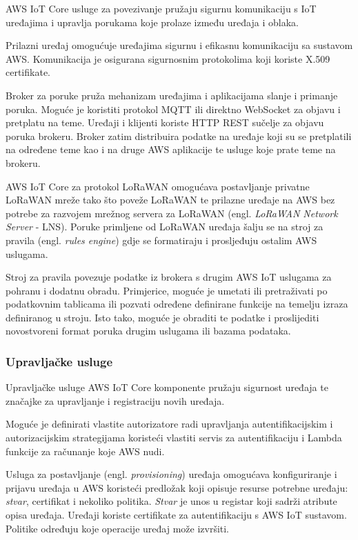 AWS IoT Core usluge za povezivanje pružaju sigurnu komunikaciju s IoT uređajima i upravlja porukama koje prolaze između uređaja i oblaka.

Prilazni uređaj omogućuje uređajima sigurnu i efikasnu komunikaciju sa sustavom AWS. Komunikacija je osigurana sigurnosnim protokolima koji koriste  X.509 certifikate. 

Broker za poruke pruža mehanizam uređajima i aplikacijama slanje i primanje poruka. Moguće je koristiti protokol MQTT ili direktno WebSocket za objavu i pretplatu na teme. Uređaji i klijenti koriste HTTP REST sučelje za objavu poruka brokeru. Broker zatim distribuira podatke na uređaje koji su se pretplatili na određene teme kao i na druge AWS aplikacije te usluge koje prate teme na brokeru.

AWS IoT Core za protokol LoRaWAN omogućava postavljanje privatne LoRaWAN mreže tako što poveže LoRaWAN te prilazne uređaje na AWS bez potrebe za razvojem mrežnog servera za LoRaWAN (engl. \textit{LoRaWAN Network Server} - LNS). Poruke primljene od LoRaWAN uređaja šalju se na stroj za pravila (engl. \textit{rules engine}) gdje se formatiraju i prosljeđuju ostalim AWS uslugama.

Stroj za pravila povezuje podatke iz brokera s drugim AWS IoT uslugama za pohranu i dodatnu obradu. Primjerice, moguće je umetati ili pretraživati po podatkovnim tablicama ili pozvati određene definirane funkcije na temelju izraza definiranog u stroju. Isto tako, moguće je obraditi te podatke i proslijediti novostvoreni format poruka drugim uslugama ili bazama podataka.

\subsubsection{Upravljačke usluge}

Upravljačke usluge AWS IoT Core komponente pružaju sigurnost uređaja te značajke za upravljanje i registraciju novih uređaja.

Moguće je definirati vlastite autorizatore radi upravljanja autentifikacijskim i autorizacijskim strategijama koristeći vlastiti servis za autentifikaciju i Lambda funkcije za računanje koje AWS nudi. 

Usluga za postavljanje (engl. \textit{provisioning}) uređaja omogućava konfiguriranje i prijavu uređaja u AWS koristeći predložak koji opisuje resurse potrebne uređaju: \textit{stvar}, certifikat i nekoliko politika. \textit{Stvar} je unos u registar koji sadrži atribute opisa uređaja. Uređaji koriste certifikate za autentifikaciju s AWS IoT sustavom. Politike određuju koje operacije uređaj može izvršiti. 

